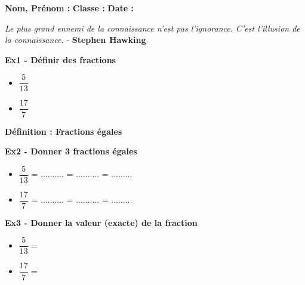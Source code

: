



\textbf{Nom, Prénom :} \hspace{8cm} \textbf{Classe :} \hspace{3cm} \textbf{Date :}\\

\begin{center}
  \textit{Le plus grand ennemi de la connaissance n'est pas l'ignorance. C'est l'illusion de la connaissance.} - \textbf{Stephen Hawking}
\end{center}

\textbf{Ex1 - Définir des fractions}

\begin{itemize}[label={$\bullet$}]
  \item $\dfrac{5}{13}$ \dotfill
  \item $\dfrac{17}{7}$ \dotfill
\end{itemize}

\textbf{Définition : Fractions égales} \\ \Pointilles[3] 


\textbf{Ex2 - Donner 3 fractions égales}

\begin{itemize}[label={$\bullet$}]
  \item $\dfrac{5}{13}$ = .......... = .......... =  ......... \\
  \item $\dfrac{17}{7}$ = .......... = .......... =  ......... \\
\end{itemize}

\textbf{Ex3 - Donner la valeur (exacte) de la fraction}\\


\begin{itemize}[label={$\bullet$}]
  \item $\dfrac{5}{13} = $ \dotfill \\
  \item $\dfrac{17}{7} = $ \dotfill \\
\end{itemize}


